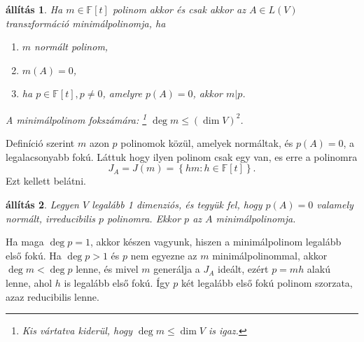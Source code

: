 \documentclass[9pt, a4paper, showtrims]{memoir}
\makeatletter
\renewenvironment{proof}[1][\proofname]
    {\par\pushQED{\qed}%
    \normalfont \topsep6\p@\@plus6\p@\relax
    \trivlist
    \item[\hskip\labelsep
        \itshape
    #1\@addpunct{:}]\ignorespaces}
    {\popQED\endtrivlist\@endpefalse}
\theoremstyle{plain}
\newtheorem{proposition}{állítás}[chapter]
\theoremstyle{remark}
\theoremstyle{definition}
\makeatother
\begin{document}
    \begin{proposition}
        Ha  $m\in\mathbb{F}\left[ t \right]$ polinom akkor és csak akkor 
        az $A\in L\left( V \right)$ transzformáció minimálpolinomja, 
        ha
        \begin{enumerate}
            \item $m$ normált polinom,
            \item $m\left( A \right)=0$,
            \item ha $p\in\mathbb{F}\left[ t \right], p\neq 0$, amelyre 
                $p\left( A \right)=0$, akkor $m|p$.
        \end{enumerate}
        A minimálpolinom fokszámára:%
        \footnote{Kis vártatva kiderül, hogy $\deg m\leq \dim V$ is igaz.}%
        $\deg m\leq(\dim V)^2$.
    \end{proposition}
    \begin{proof}
        Definíció szerint $m$ azon $p$ polinomok közül, 
        amelyek normáltak, és $p\left( A \right)=0$, a legalacsonyabb fokú.
        Láttuk hogy ilyen polinom csak egy van, es erre a polinomra
        \[
            J_{A}=J\left( m \right)=\left\{ hm:h\in\mathbb{F}\left[ t \right] \right\}.
        \]
        Ezt kellett belátni. 
    \end{proof}
    \begin{proposition}
        Legyen $V$ legalább 1 dimenziós, 
        és tegyük fel, hogy $p\left( A \right)=0$ valamely normált,
        irreducibilis $p$ polinomra.
        Ekkor $p$ az $A$ minimálpolinomja.
    \end{proposition}
    \begin{proof}
        Ha maga $\deg p=1$, akkor készen vagyunk, hiszen a minimálpolinom legalább első fokú.
        Ha $\deg p>1$ és $p$ nem egyezne az $m$ minimálpolinommal,
        akkor $\deg m<\deg p$ lenne, és mivel $m$ generálja a $J_{A}$ ideált,
        ezért $p=mh$ alakú lenne, ahol $h$ is legalább első fokú.
        Így $p$ két legalább első fokú polinom szorzata, azaz reducibilis lenne.
    \end{proof}
\end{document}
